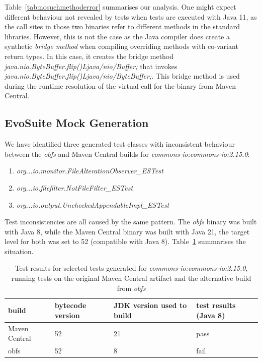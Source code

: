 \documentclass[conference]{IEEEtran}
\begin{document}
Table~\ref{tab:nosuchmethoderror} summarises our analysis. One might expect different behaviour not revealed by tests when tests are executed with Java 11, as the call sites in those two binaries refer to different methods in the standard libraries. However, this is not the case as the Java compiler does create a synthetic \textit{bridge method} when compiling overriding methods with co-variant return types. In this case, it creates the bridge method \textit{java.nio.ByteBuffer.flip()Ljava/nio/Buffer;}  that invokes \textit{java.nio.ByteBuffer.flip()Ljava/nio/ByteBuffer;}. This bridge method is used during the  runtime resolution of the virtual call for the binary from Maven Central.  


\subsection{EvoSuite Mock Generation}


We have identified three generated test classes with inconsistent behaviour between the \textit{obfs} and Maven Central builds for \textit{commons-io:commons-io:2.15.0}: 
\begin{enumerate}
	\item  \textit{org...io.monitor.FileAlterationObserver\_ESTest}
    \item \textit{org...io.filefilter.NotFileFilter\_ESTest}
    \item  \textit{org...io.output.UncheckedAppendableImpl\_ESTest}
\end{enumerate}

Test inconsistencies are all caused by the same pattern.  The \textit{obfs} binary was built  with Java 8, while the Maven Central binary was built with Java 21, the target level for both was set to 52 (compatible with Java 8). Table~\ref{tab:stackoverflow} summarises the situation.


\begin{table}[h]
	\begin{tabular}{|p{2.0cm}p{1.2cm}p{1.5cm}p{1.3cm}|}
		\hline
		build         & bytecode version & JDK version used to build & test results (Java 8)                                            \\ \hline 
		Maven Central & 52       & 21                        & pass                                                                                        \\
		obfs         & 52               & 8                        & fail              \\ \hline
	\end{tabular}
	\caption{Test results for selected tests generated for  \textit{commons-io:commons-io:2.15.0}, running tests on the original Maven Central artifact and the alternative build from \textit{obfs}}
	\label{tab:stackoverflow}
\end{table}
\end{document}
